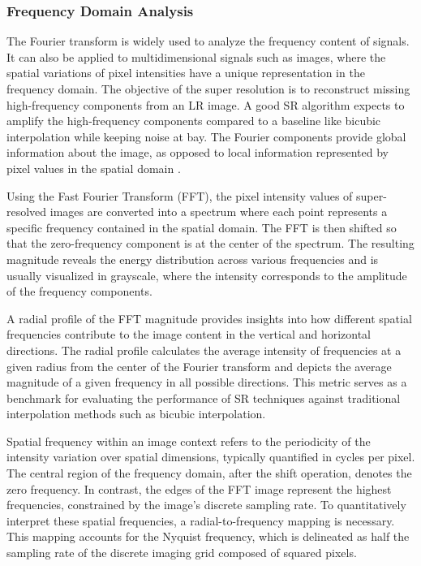         \subsubsection{Frequency Domain Analysis} \label{subsubsec:frequency_domain_analysis}
        
        The Fourier transform is widely used to analyze the frequency content of signals.
        It can also be applied to multidimensional signals such as images, where the spatial variations of pixel intensities have a unique representation in the frequency domain. 
        The objective of the super resolution is to reconstruct missing high-frequency components from an LR image.
        A good SR algorithm expects to amplify the high-frequency components compared to a baseline like bicubic interpolation while keeping noise at bay.
        The Fourier components provide global information about the image, as opposed to local information represented by pixel values in the spatial domain \cite{fuoli2021fourier}. 
        
        Using the Fast Fourier Transform (FFT), the pixel intensity values of super-resolved images are converted into a spectrum where each point represents a specific frequency contained in the spatial domain.
        The FFT is then shifted so that the zero-frequency component is at the center of the spectrum. 
        The resulting magnitude reveals the energy distribution across various frequencies and is usually visualized in grayscale, where the intensity corresponds to the amplitude of the frequency components.
        
        A radial profile of the FFT magnitude provides insights into how different spatial frequencies contribute to the image content in the vertical and horizontal directions.
        The radial profile calculates the average intensity of frequencies at a given radius from the center of the Fourier transform and depicts the average magnitude of a given frequency in all possible directions. This metric serves as a benchmark for evaluating the performance of SR techniques against traditional interpolation methods such as bicubic interpolation.
        
        Spatial frequency within an image context refers to the periodicity of the intensity variation over spatial dimensions, typically quantified in cycles per pixel. The central region of the frequency domain, after the shift operation, denotes the zero frequency. In contrast, the edges of the FFT image represent the highest frequencies, constrained by the image's discrete sampling rate.
        To quantitatively interpret these spatial frequencies, a radial-to-frequency mapping is necessary. This mapping accounts for the Nyquist frequency, which is delineated as half the sampling rate of the discrete imaging grid composed of squared pixels.

